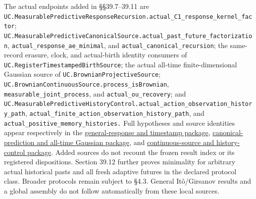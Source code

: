 \documentclass[
  english,
  11pt,
  oneside]{book}
\begin{document}
The actual endpoints added in §§39.7--39.11 are \nolinkurl{UC.MeasurablePredictiveResponseRecursion.actual_C1_response_kernel_factor}; \nolinkurl{UC.MeasurablePredictiveCanonicalSource.actual_past_future_factorization}, \nolinkurl{actual_response_ae_minimal}, and \nolinkurl{actual_canonical_recursion}; the same-record erasure, clock, and actual-birth identity consumers of \nolinkurl{UC.RegisterTimestampedBirthSource}; the actual all-time finite-dimensional Gaussian source of \nolinkurl{UC.BrownianProjectiveSource}; \nolinkurl{UC.BrownianContinuousSource.process_isBrownian}, \nolinkurl{measurable_joint_process}, and \nolinkurl{actual_ou_recovery}; and \nolinkurl{UC.MeasurablePredictiveHistoryControl.actual_action_observation_history_path}, \nolinkurl{actual_finite_action_observation_history_path}, and \nolinkurl{actual_positive_memory_histories.} Full hypotheses and source identities appear respectively in the \href{../formalization/ueot-core/docs/compression/theory_completion/unified_closure/predictive_genealogy_source_v1/RESULTS_AND_OPEN_OBLIGATIONS.md}{general-response and timestamp package}, \href{../formalization/ueot-core/docs/compression/theory_completion/unified_closure/canonical_brownian_source_v1/RESULTS_AND_OPEN_OBLIGATIONS.md}{canonical-prediction and all-time Gaussian package}, and \href{../formalization/ueot-core/docs/compression/theory_completion/unified_closure/continuous_history_source_v1/RESULTS_AND_OPEN_OBLIGATIONS.md}{continuous-source and history-control package}. Added sources do not recount the frozen result index or its registered dispositions. Section 39.12 further proves minimality for arbitrary actual historical pasts and all fresh adaptive futures in the declared protocol class. Broader protocols remain subject to §4.3. General Itô/Girsanov results and a global assembly do not follow automatically from these local sources.
\end{document}
